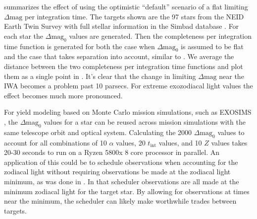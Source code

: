  summarizes the effect of using the optimistic
``default'' scenario of a flat limiting $\Delta\textrm{mag}$ per integration
time. The targets shown are the 97 stars from the NEID Earth Twin Survey with
full stellar information in the Simbad database
\citep{guptaTargetPrioritization2021}. For each star the
$\Delta\textrm{mag}_0$ values are generated. Then the completeness per
integration time function is generated for both the case when
$\Delta\textrm{mag}_0$ is assumed to be flat and the case that takes separation
into account, similar to . We average the distance
between the two completeness per integration time functions and plot them as a
single point in . It's clear that the change in
limiting $\Delta\textrm{mag}$ near the IWA becomes a problem past 10 parsecs.
For extreme exozodiacal light values the effect becomes much more pronounced.

For yield modeling based on Monte Carlo mission simulations, such as EXOSIMS
\citep{savranskyWFIRSTAFTACoronagraphScience2015, delacroixScienceYield2016,
savranskyEXOSIMSExoplanetOpenSource2017}, the $\Delta\textrm{mag}_0$ values for
a star can be reused across mission simulations with the same telescope orbit
and optical system. Calculating the 2000 $\Delta\textrm{mag}_0$ values to
account for all combinations of 10 $\alpha$ values, 20 $t_\textrm{int}$ values,
and 10 $Z$ values takes 20-30 seconds to run on a Ryzen 5800x 8 core processor
in parallel. An application of this could be to schedule observations when
accounting for the zodiacal light without requiring observations be made at the
zodiacal light minimum, as was done in \citet{keithlyOptimalScheduling2020}. In
that scheduler observations are all made at the minimum zodiacal light for the
target star. By allowing for observations at times near the minimum, the
scheduler can likely make worthwhile trades between targets.



